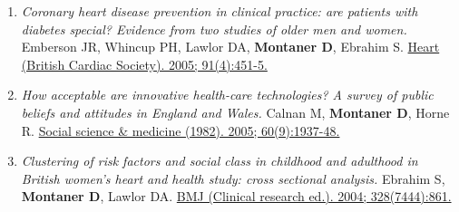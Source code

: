 \begin{enumerate}
{  research. 2006; 34(Web Server issue):W472-6.}
\item
  \emph{Coronary heart disease prevention in clinical practice: are
  patients with diabetes special? Evidence from two studies of older men
  and women.} Emberson JR, Whincup PH, Lawlor DA, \textbf{Montaner D},
  Ebrahim S. \href{http://www.ncbi.nlm.nih.gov//pubmed/15772196}{Heart
  (British Cardiac Society). 2005; 91(4):451-5.}
\item
  \emph{How acceptable are innovative health-care technologies? A survey
  of public beliefs and attitudes in England and Wales.} Calnan M,
  \textbf{Montaner D}, Horne R.
  \href{http://www.ncbi.nlm.nih.gov//pubmed/15743645}{Social science \&
  medicine (1982). 2005; 60(9):1937-48.}
\item
  \emph{Clustering of risk factors and social class in childhood and
  adulthood in British women's heart and health study: cross sectional
  analysis.} Ebrahim S, \textbf{Montaner D}, Lawlor DA.
  \href{http://www.ncbi.nlm.nih.gov//pubmed/15006898}{BMJ (Clinical
  research ed.). 2004; 328(7444):861.}
\end{enumerate}
